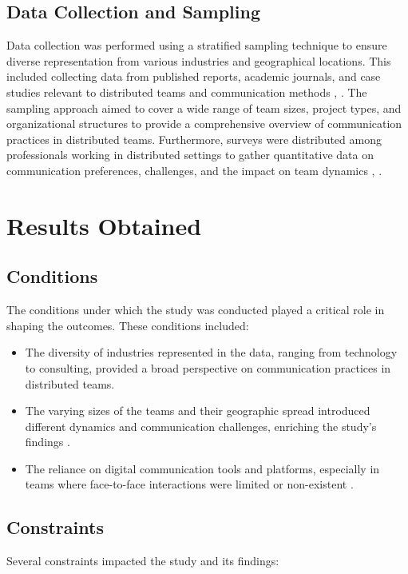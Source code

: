 \documentclass[12pt]{article}
\begin{document}
\subsection{Data Collection and Sampling}
Data collection was performed using a stratified sampling technique to ensure diverse representation from various industries and geographical locations. This included collecting data from published reports, academic journals, and case studies relevant to distributed teams and communication methods \cite{ref1}, \cite{ref8}. The sampling approach aimed to cover a wide range of team sizes, project types, and organizational structures to provide a comprehensive overview of communication practices in distributed teams. Furthermore, surveys were distributed among professionals working in distributed settings to gather quantitative data on communication preferences, challenges, and the impact on team dynamics \cite{ref3}, \cite{ref9}.

\newpage

\section{Results Obtained}

\subsection{Conditions}
The conditions under which the study was conducted played a critical role in shaping the outcomes. These conditions included:

\begin{itemize}
    \item The diversity of industries represented in the data, ranging from technology to consulting, provided a broad perspective on communication practices in distributed teams.
    \item The varying sizes of the teams and their geographic spread introduced different dynamics and communication challenges, enriching the study's findings \cite{ref8}.
    \item The reliance on digital communication tools and platforms, especially in teams where face-to-face interactions were limited or non-existent \cite{ref3}.
\end{itemize}

\subsection{Constraints}
Several constraints impacted the study and its findings:
\end{document}

